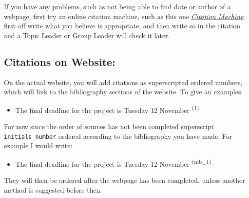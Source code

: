 \documentclass{article}
\begin{document}
If you have any problems, such as not being able to find date or author of a webpage, first try an online citation machine, such as this one \href{http://www.citationmachine.net/}{\underline{\emph{Citation Machine}}}
first off write what you believe is appropriate, and then write so in the citation and a Topic Leader or Group Leader will check it later. \medskip

\subsection{Citations on Website:} 
\label{subsec:cit}

On the actual website, you will add citations as superscripted ordered numbers, which will link to the bibliography sections of the website. To give an examples:

\begin{itemize}
\item The final deadline for the project is Tuesday 12 November \textsuperscript{(1)}
\end{itemize}

For now since the order of sources has not been completed superscript \texttt{initials\_number} ordered according to the bibliography you have made. For example I would write:

\begin{itemize}
\item The final deadline for the project is Tuesday 12 November \textsuperscript{(mb\_1)}
\end{itemize}

They will then be ordered after the webpage has been completed, unless another method is suggested before then.
\end{document}
